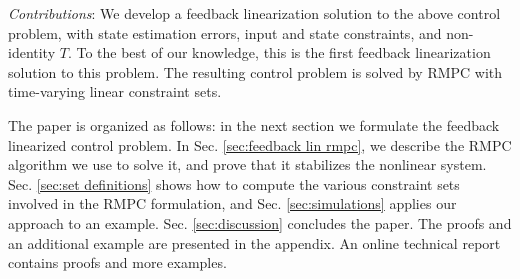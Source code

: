 \emph{Contributions}: We develop a feedback linearization solution to the above control problem, with state estimation errors, input and state constraints, and non-identity $T$.
To the best of our knowledge, this is the first feedback linearization solution to this problem.
The resulting control problem is solved by RMPC with time-varying linear constraint sets.

The paper is organized as follows: in the next section we formulate the feedback linearized control problem. In Sec. \ref{sec:feedback lin rmpc}, we describe the RMPC algorithm we use to solve it, and prove that it stabilizes the nonlinear system. 
Sec. \ref{sec:set definitions} shows how to compute the various constraint sets involved in the RMPC formulation, and Sec. \ref{sec:simulations} applies our approach to an example. Sec. \ref{sec:discussion} concludes the paper.
{
The proofs and an additional example are presented in the appendix.
} 
{
An online technical report \cite{PantAM16_RMPC} contains proofs and more examples.
}
